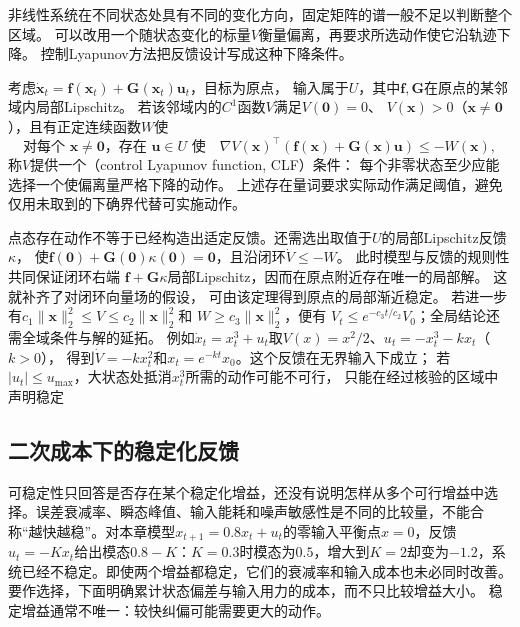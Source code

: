 非线性系统在不同状态处具有不同的变化方向，固定矩阵的谱一般不足以判断整个区域。
可以改用一个随状态变化的标量$V$衡量偏离，再要求所选动作使它沿轨迹下降。
控制Lyapunov方法把反馈设计写成这种下降条件。
\begin{definition}[控制Lyapunov函数条件]
\label{def:control-clf}
考虑$\dot{\bm x}_t=\bm f(\bm x_t)+\bm G(\bm x_t)\bm u_t$，目标为原点，
输入属于$U$，其中$\bm f,\bm G$在原点的某邻域内局部Lipschitz。
若该邻域内的$C^1$函数$V$满足$V(\bm0)=0$、
$V(\bm x)>0$（$\bm x\neq\bm0$），且有正定连续函数$W$使
\[
  \text{对每个 }\bm x\neq\bm0\text{，存在 }\bm u\in U\text{ 使}
  \quad\nabla V(\bm x)^\top(\bm f(\bm x)+\bm G(\bm x)\bm u)
  \leq-W(\bm x),
\]
称$V$提供一个（control Lyapunov function, CLF）条件：
每个非零状态至少应能选择一个使偏离量严格下降的动作。
上述存在量词要求实际动作满足阈值，避免仅用未取到的下确界代替可实施动作。
\end{definition}

点态存在动作不等于已经构造出适定反馈。还需选出取值于$U$的局部Lipschitz反馈$\kappa$，
使$\bm f(\bm0)+\bm G(\bm0)\kappa(\bm0)=\bm0$，且沿闭环$\dot V\leq-W$。
此时模型与反馈的规则性共同保证闭环右端
$\bm f+\bm G\kappa$局部Lipschitz，因而在原点附近存在唯一的局部解。
这就补齐了对闭环向量场的假设，
可由该定理得到原点的局部渐近稳定。
若进一步有$c_1\|\bm x\|_2^2\leq V\leq c_2\|\bm x\|_2^2$和
$W\geq c_3\|\bm x\|_2^2$，便有
$V_t\leq e^{-c_3t/c_2}V_0$；全局结论还需全域条件与解的延拓。
例如$\dot x_t=x_t^3+u_t$取$V(x)=x^2/2$、$u_t=-x_t^3-kx_t$（$k>0$），
得到$\dot V=-kx_t^2$和$x_t=e^{-kt}x_0$。这个反馈在无界输入下成立；
若$|u_t|\leq u_{\max}$，大状态处抵消$x_t^3$所需的动作可能不可行，
只能在经过核验的区域中声明稳定

\subsection{二次成本下的稳定化反馈}
\label{sec:control-lqr-riccati}
可稳定性只回答是否存在某个稳定化增益，还没有说明怎样从多个可行增益中选择。误差衰减率、瞬态峰值、输入能耗和噪声敏感性是不同的比较量，不能合称“越快越稳”。对本章模型\(x_{t+1}=0.8x_t+u_t\)的零输入平衡点\(x=0\)，反馈\(u_t=-Kx_t\)给出模态\(0.8-K\)：\(K=0.3\)时模态为\(0.5\)，增大到\(K=2\)却变为\(-1.2\)，系统已经不稳定。即使两个增益都稳定，它们的衰减率和输入成本也未必同时改善。要作选择，下面明确累计状态偏差与输入用力的成本，而不只比较增益大小。
稳定增益通常不唯一：较快纠偏可能需要更大的动作。

